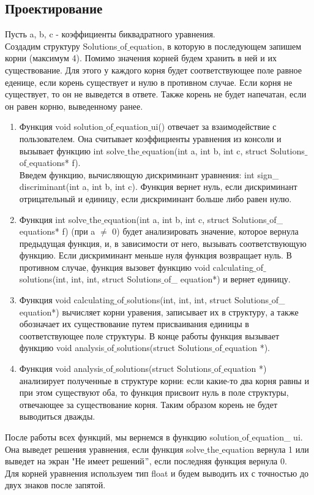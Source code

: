 \documentclass[12pt,a4paper]{report}
\begin{document}
\subsection{Проектирование}
Пусть a, b, c - коэффициенты биквадратного уравнения. \\
Создадим структуру Solutions$\_$of$\_$equation, в которую в последующем запишем корни (максимум 4). Помимо значения корней будем хранить в ней и их существование. Для этого у каждого корня будет соответствующее поле равное еденице, если корень существует и нулю в противном случае. Если корня не существует, то он не выведется в ответе. Также корень не будет напечатан, если он равен корню, выведенному ранее. \\
\begin{enumerate}
\item
Функция void solution$\_$of$\_$equation$\_$ui() отвечает за взаимодействие с пользователем. Она считывает коэффициенты уравнения из консоли и вызывает функцию int solve$\_$the$\_$equation(int a, int b, int c, struct Solutions$\_$of$\_$equations* f).  \\
Введем функцию, вычисляющую дискриминант уравнения: int sign\_ discriminant(int a, int b, int c). Функция вернет нуль, если дискриминант отрицательный и единицу, если дискриминант больше либо равен нулю. \\
\item
Функция  int solve$\_$the$\_$equation(int a, int b, int c, struct Solutions$\_$of\_ equations* f) (при a $\neq$ 0) будет анализировать значение, которое вернула предыдущая функция, и, в  зависимости от него, вызывать соответствующую функцию. Если дискриминант меньше нуля функция возвращает нуль. В противном случае, функция вызовет функцию void calculating$\_$of$\_$solutions(int, int, int, struct Solutions$\_$of\_ equation*) и вернет единицу. 
\item
Функция void calculating$\_$of$\_$solutions(int, int, int, struct Solutions$\_$of\_ equation*) вычисляет корни уравения, записывает их в структуру, а также обозначает их существование путем присваивания единицы в соответствующее поле структуры. В конце работы функция вызывает функцию void analysis$\_$of$\_$solutions(struct Solutions$\_$of$\_$equation *). \\
\item
Функция void analysis$\_$of$\_$solutions(struct Solutions$\_$of$\_$equation *) анализирует полученные в структуре корни: если какие-то два корня равны и при этом существуют оба, то функция присвоит нуль в поле структуры, отвечающее за существование корня. Таким образом корень не будет выводиться дважды. \\
\end{enumerate}
После работы всех функций, мы вернемся в функцию solution$\_$of$\_$equation\_ ui. Она выведет решения уравнения, если функция solve$\_$the$\_$equation вернула 1 или выведет на экран "Не имеет решений$"$, если последняя функция вернула 0. \\
Для корней уравнения используем тип float и будем выводить их с точностью до двух знаков после запятой. 
\end{document}
